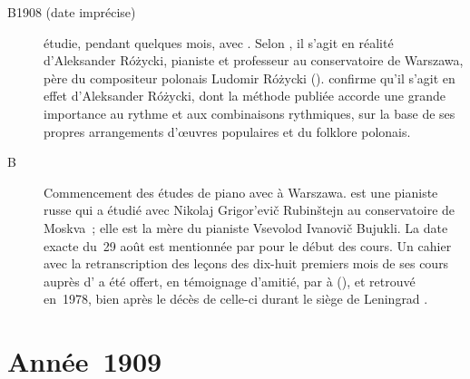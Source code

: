 \begin{description}
 \item[B1908 (date imprécise)]
 \VSofronitsky{} étudie, pendant quelques mois, avec  \citep{Vitsinsky}.
 Selon \citet{Voskobojnikov16}, il s'agit en réalité d'\hbox{Aleksander}
 Różycki, pianiste et professeur au conservatoire de Warszawa, père du
 compositeur polonais Ludomir Różycki ().
 \citet[p.~134, 138 et~148]{Nekrasova08} confirme qu'il s'agit en effet
 d'\hbox{Aleksander} Różycki, dont la méthode publiée accorde une grande
 importance au rythme et aux combinaisons rythmiques, sur la base de ses
 propres arrangements d'œuvres populaires et du folklore polonais.
 \item[B]
 Commencement des études de piano avec \ALebedevaGetsevich{} à Warszawa.
 \ALebedevaGetsevich{} est une pianiste russe qui a étudié avec Nikolaj
 Grigor'evič Rubinštejn au conservatoire de Moskva~; elle est la mère du
 pianiste Vsevolod Ivanovič Bujukli.
 La date exacte du~29 août est mentionnée par \citet[p.~135]{Nekrasova08}
 pour le début des cours.
 Un cahier avec la retranscription des leçons des dix-huit premiers mois de
 ses cours auprès d'\ALebedevaGetsevich{} a été offert, en témoignage
 d'amitié, par \VSofronitsky{} à \EDaugovet{} (), et
 retrouvé en~1978, bien après le décès de celle-ci durant le siège de
 Leningrad \citep[voir][p.~135-136]{Nekrasova08}.
\end{description}

\section{Année~1909}

